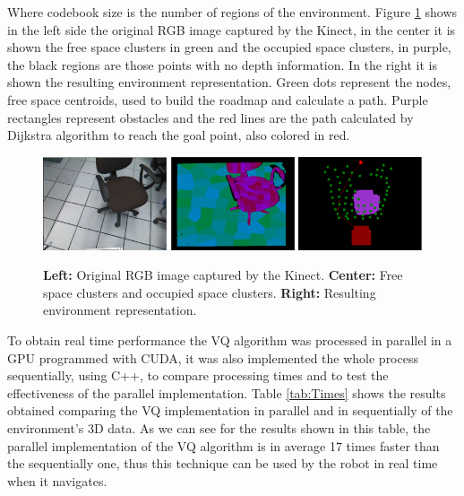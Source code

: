 \documentclass{llncs}
\begin{document}
\vspace{0.1 in}

 Where codebook size is the number of regions of the environment.
Figure \ref{fig:ResultingClusters} shows in the left side the original RGB image captured by the Kinect, in the center
it is shown the free space clusters in green and the occupied space clusters, in purple, the black regions are those points with no 
depth information. In the right it is shown the resulting environment representation. Green dots represent the nodes,
free space centroids, used to build the roadmap and calculate a path. Purple rectangles represent obstacles and the red lines are 
the path calculated by Dijkstra algorithm to reach the goal point, also colored in red.


\begin{figure}[!ht]
\begin{center}
\includegraphics[width=3.65cm,width=3.0cm]{Figures/VQ_Original.eps}
\includegraphics[width=3.65cm,width=3.0cm]{Figures/VQ_Clustered.eps}
\includegraphics[width=3.65cm,width=3.0cm]{Figures/VQ_Map.eps}
\end{center}
\caption{\textbf{Left:} Original RGB image captured by the Kinect. \textbf{Center:} Free space clusters and occupied space clusters.
\textbf{Right:} Resulting environment representation.}
\label{fig:ResultingClusters}
\end{figure}

To obtain real time performance the VQ algorithm was processed in parallel in a GPU programmed with CUDA, it was also implemented
the whole process sequentially, using C++, to compare processing times and to test the effectiveness of the parallel 
implementation. Table \ref{tab:Times} shows the results obtained comparing the VQ implementation in parallel and in sequentially of 
the environment's 3D data.
As we can see for the results shown in this table, the parallel implementation of the VQ algorithm is in average 17 times faster 
than the sequentially one, thus this technique can be used by the robot in real time when it navigates.
\end{document}
